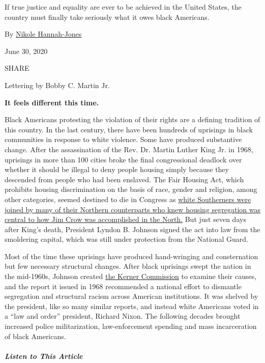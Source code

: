 If true justice and equality are ever to be achieved in the United
States, the country must finally take seriously what it owes black
Americans.

By
\href{https://www.nytimes3xbfgragh.onion/by/nikole-hannah-jones}{Nikole
Hannah-Jones}

June 30, 2020

SHARE

Lettering by Bobby C. Martin Jr.

\textbf{It feels different this time.}

Black Americans protesting the violation of their rights are a defining
tradition of this country. In the last century, there have been hundreds
of uprisings in black communities in response to white violence. Some
have produced substantive change. After the assassination of the Rev.
Dr. Martin Luther King Jr. in 1968, uprisings in more than 100 cities
broke the final congressional deadlock over whether it should be illegal
to deny people housing simply because they descended from people who had
been enslaved. The Fair Housing Act, which prohibits housing
discrimination on the basis of race, gender and religion, among other
categories, seemed destined to die in Congress as
\href{https://www.propublica.org/article/living-apart-how-the-government-betrayed-a-landmark-civil-rights-law}{white
Southerners were joined by many of their Northern counterparts who knew
housing segregation was central to how Jim Crow was accomplished in the
North.} But just seven days after King's death, President Lyndon B.
Johnson signed the act into law from the smoldering capital, which was
still under protection from the National Guard.

Most of the time these uprisings have produced hand-wringing and
consternation but few necessary structural changes. After black
uprisings swept the nation in the mid-1960s, Johnson created
\href{https://digitalcommons.ilr.cornell.edu/cgi/viewcontent.cgi?article=1047\&context=hrpubs}{the
Kerner Commission} to examine their causes, and the report it issued in
1968 recommended a national effort to dismantle segregation and
structural racism across American institutions. It was shelved by the
president, like so many similar reports, and instead white Americans
voted in a ``law and order'' president, Richard Nixon. The following
decades brought increased police militarization, law-enforcement
spending and mass incarceration of black Americans.

\hypertarget{listen-to-this-article}{%
\subparagraph{Listen to This Article}\label{listen-to-this-article}}

